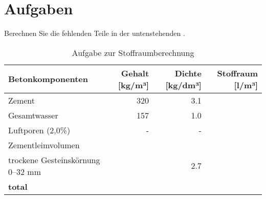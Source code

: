 \section*{Aufgaben}
\begin{questions}
    \question Berechnen Sie die fehlenden Teile in der untenstehenden .
    \begin{table}[h]
        \centering
        \caption{Aufgabe zur Stoffraumberechnung}
        \begin{tabular}{lrrr}
        \toprule
        \textbf{Betonkomponenten}       & \textbf{Gehalt [kg/m³]} & \textbf{Dichte [kg/dm³]} & \textbf{Stoffraum [l/m³]} \\ 
        \midrule
        Zement                           & 320                      & 3.1                       &    {}          \\
        Gesamtwasser                     & 157                      & 1.0                       & {}            \\
        Luftporen (2,0\%)                & -                        & -                         & {}              \\
        Zementleimvolumen                &                          &                           &                           \\
        trockene Gesteinskörnung 0–32 mm & {}                     & 2.7                       & {}             \\
        \textbf{total}                   & {}           &            {}               & {}             \\
        \bottomrule
    \end{tabular}
    \label{tab:Stoffraumberechnung1}
        \end{table}

    \begin{solution}

        \begin{table}[H]
            \centering
        

\end{table}
\end{solution}
\end{questions}
